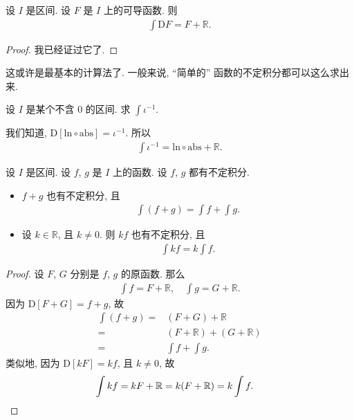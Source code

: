 \begin{theorem}
    设 $I$ 是区间. 设 $F$ 是 $I$ 上的可导函数. 则
    \begin{align*}
        \int {\mathrm{D}F} = F + \mathbb{R}.
    \end{align*}
\end{theorem}

\begin{proof}
    我已经证过它了.
\end{proof}

这或许是最基本的计算法了. 一般来说, ``简单的'' 函数的不定积分都可以这么求出来.

\begin{example}
    设 $I$ 是某个不含 $0$ 的区间. 求 $\int {\iota^{-1}}$.

    我们知道, $\mathrm{D}[\mathrm{ln} \circ \mathrm{abs}] = \iota^{-1}$. 所以
    \begin{align*}
        \int {\iota^{-1}} = \mathrm{ln} \circ \mathrm{abs} + \mathbb{R}.
    \end{align*}
\end{example}

\begin{theorem}
    设 $I$ 是区间. 设 $f$, $g$ 是 $I$ 上的函数. 设 $f$, $g$ 都有不定积分.
    \begin{itemize}
        \item $f + g$ 也有不定积分, 且
              \begin{align*}
                  \int {(f + g)} = \int {f} + \int {g}.
              \end{align*}
        \item 设 $k \in \mathbb{R}$, 且 $k \neq 0$. 则 $kf$ 也有不定积分, 且
              \begin{align*}
                  \int {kf} = k \int{f}.
              \end{align*}
    \end{itemize}
\end{theorem}

\begin{proof}
    设 $F$, $G$ 分别是 $f$, $g$ 的原函数. 那么
    \begin{align*}
        \int {f} = F + \mathbb{R}, \quad \int {g} = G + \mathbb{R}.
    \end{align*}
    因为 $\mathrm{D}[F + G] = f + g$, 故
    \begin{align*}
        \int {(f + g)}
        = {} & (F + G) + \mathbb{R}                \\
        = {} & (F + \mathbb{R}) + (G + \mathbb{R}) \\
        = {} & \int {f} + \int {g}.
    \end{align*}
    类似地, 因为 $\mathrm{D}[kF] = kf$, 且 $k \neq 0$, 故
    \begin{align*}
         & {\int {kf}} = kF + \mathbb{R} = k(F + \mathbb{R}) = k\int {f}. \qedhere
    \end{align*}
\end{proof}


